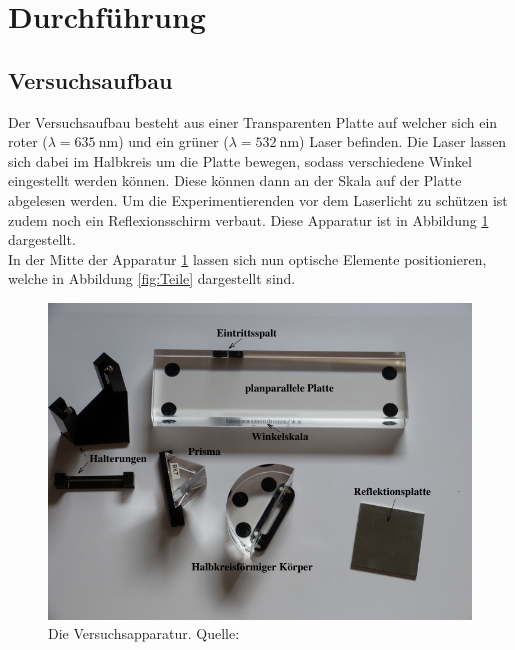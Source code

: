 \section{Durchführung}
\label{sec:Durchführung}
\subsection{Versuchsaufbau}
\label{sec:aufbau}
Der Versuchsaufbau besteht aus einer Transparenten Platte auf welcher sich ein roter
($\lambda=\SI{635}{\nano\metre}$) und ein grüner ($\lambda=\SI{532}{\nano\metre}$) Laser 
befinden. Die Laser lassen sich dabei im Halbkreis um die Platte bewegen, sodass verschiedene
Winkel eingestellt werden können. Diese können dann an der Skala auf der Platte abgelesen werden.
Um die Experimentierenden vor dem Laserlicht zu schützen ist zudem noch ein Reflexionsschirm
verbaut. Diese Apparatur ist in Abbildung \ref{fig:Aufbau} dargestellt.
\\\noindent 
In der Mitte der Apparatur \ref{fig:Aufbau} lassen sich nun optische Elemente positionieren, welche
in Abbildung \ref{fig:Teile} dargestellt sind. 
\begin{figure}[H]
    \centering
    \includegraphics[scale = 0.3]{pictures/Aufbau.png}
    \caption{Die Versuchsapparatur. Quelle: \cite{AP01}}
    \label{fig:Aufbau}
\end{figure}
